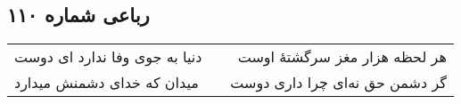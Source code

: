 \begin{center}
\section*{رباعی شماره ۱۱۰}
\label{sec:sh110}
\begin{longtable}{l p{0.5cm} r}
دنیا به جوی وفا ندارد ای دوست
&&
هر لحظه هزار مغز سرگشتهٔ اوست
\\
میدان که خدای دشمنش میدارد
&&
گر دشمن حق نه‌ای چرا داری دوست
\\
\end{longtable}
\end{center}
